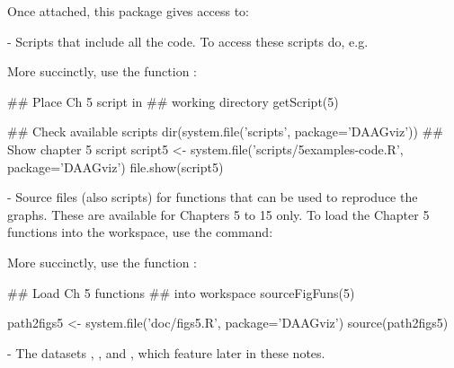 Once attached, this package gives access to:
\begin{itemizz}
\item[-]
Scripts that include all the code. To access these scripts do, e.g.
\begin{marginfigure}[66pt]
More succinctly, use the function :\\[-3pt]
\begin{Schunk}
\begin{Sinput}
## Place Ch 5 script in
## working directory
getScript(5)
\end{Sinput}
\end{Schunk}
\end{marginfigure}
\begin{Schunk}
\begin{Sinput}
## Check available scripts
dir(system.file('scripts', package='DAAGviz'))
## Show chapter 5 script
script5 <- system.file('scripts/5examples-code.R',
                       package='DAAGviz')
file.show(script5)
\end{Sinput}
\end{Schunk}
\item[-]
Source files (also scripts) for functions that can be used to
  reproduce the graphs. These are available for Chapters 5 to 15
only.  To load the Chapter 5 functions into the workspace,
use the command:
\begin{marginfigure}[54pt]
More succinctly, use the function :\\[-3pt]
\begin{Schunk}
\begin{Sinput}
## Load Ch 5 functions
## into workspace
sourceFigFuns(5)
\end{Sinput}
\end{Schunk}
\end{marginfigure}
\begin{Schunk}
\begin{Sinput}
path2figs5 <- system.file('doc/figs5.R',
                          package='DAAGviz')
source(path2figs5)
\end{Sinput}
\end{Schunk}
\item[-] The datasets , , and
  , which feature later in these notes.
\end{itemizz}
\newpage

